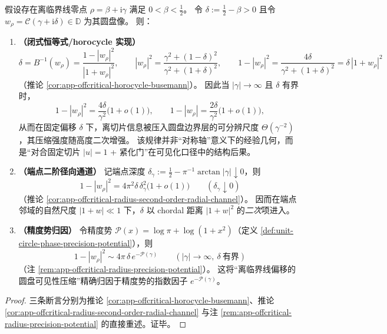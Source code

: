 \begin{theorem}[离临界线偏移的二次径向压缩律与精度势归因]\label{thm:xi-offcritical-quadratic-radial-compression}
假设存在离临界线零点 \(\rho=\beta+\mathrm{i}\gamma\) 满足 \(0<\beta<\tfrac12\)。
令
\(
\delta:=\tfrac12-\beta>0
\)
且令 \(w_\rho=\mathcal{C}(\gamma+\mathrm{i}\delta)\in\mathbb{D}\) 为其圆盘像。
则：
\begin{enumerate}
  \item \textbf{（闭式恒等式/horocycle 实现）}
  \[
  \delta=B^{-1}(w_\rho)=\frac{1-|w_\rho|^2}{|1+w_\rho|^2},
  \qquad
  |w_\rho|^2=\frac{\gamma^2+(1-\delta)^2}{\gamma^2+(1+\delta)^2},
  \qquad
  1-|w_\rho|^2=\frac{4\delta}{\gamma^2+(1+\delta)^2}=\delta\,|1+w_\rho|^2
  \]
  （推论 \ref{cor:app-offcritical-horocycle-busemann}）。
  因此当 \(|\gamma|\to\infty\) 且 \(\delta\) 有界时，
  \[
  1-|w_\rho|^{2}=\frac{4\delta}{\gamma^{2}}\bigl(1+o(1)\bigr),
  \qquad
  1-|w_\rho|=\frac{2\delta}{\gamma^{2}}\bigl(1+o(1)\bigr),
  \]
  从而在固定偏移 \(\delta\) 下，离切片信息被压入圆盘边界层的可分辨尺度 \(\Theta(\gamma^{-2})\)，其压缩强度随高度二次增强。
  该规律并非“对称轴”意义下的经验几何，而是“对合固定切片 \(|u|=1\) + 紧化门”在可见化口径中的结构后果。
  \item \textbf{（端点二阶径向通道）}
  记端点深度 \(\delta_\gamma:=\tfrac12-\pi^{-1}\arctan|\gamma|\downarrow 0\)，则
  \[
  1-|w_\rho|^2
  =4\pi^2\delta\,\delta_\gamma^2\bigl(1+o(1)\bigr)\qquad(\delta_\gamma\downarrow 0)
  \]
  （推论 \ref{cor:app-offcritical-radius-second-order-radial-channel}）。
  因而在端点邻域的自然尺度 \(|1+w|\ll 1\) 下，\(\delta\) 以 chordal 距离 \(|1+w|^2\) 的\emph{二次}项进入。
  \item \textbf{（精度势归因）}
  令精度势 \(\mathcal{P}(x)=\log\pi+\log(1+x^2)\)（定义 \ref{def:unit-circle-phase-precision-potential}），则
  \[
  1-|w_\rho|^2\sim 4\pi\,\delta\,e^{-\mathcal{P}(\gamma)}\qquad(|\gamma|\to\infty,\ \delta\ \text{有界})
  \]
  （注 \ref{rem:app-offcritical-radius-precision-potential}）。
  这将“离临界线偏移的圆盘可见性压缩”精确归因于精度势的指数因子 \(e^{-\mathcal{P}(\gamma)}\)。
\end{enumerate}
\end{theorem}

\begin{proof}
三条断言分别为推论 \ref{cor:app-offcritical-horocycle-busemann}、推论 \ref{cor:app-offcritical-radius-second-order-radial-channel} 与注 \ref{rem:app-offcritical-radius-precision-potential} 的直接重述。证毕。
\end{proof}


